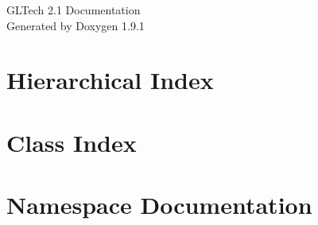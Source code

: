 \let\mypdfximage\pdfximage\def\pdfximage{\immediate\mypdfximage}\documentclass[twoside]{book}
\newcommand{\+}{\discretionary{\mbox{\scriptsize$\hookleftarrow$}}{}{}}
\newcommand{\clearemptydoublepage}{%
  \newpage{\pagestyle{empty}\cleardoublepage}%
}
\begin{document}
\raggedbottom

\hypersetup{pageanchor=false,
             bookmarksnumbered=true,
             pdfencoding=unicode
            }
\begin{titlepage}
\vspace*{7cm}
\begin{center}%
{\Large GLTech 2.1 Documentation }\\
\vspace*{1cm}
{\large Generated by Doxygen 1.9.1}\\
\end{center}
\end{titlepage}
\clearemptydoublepage
{}
\tableofcontents
\clearemptydoublepage
{}
\hypersetup{pageanchor=true}

\chapter{Hierarchical Index}

\chapter{Class Index}

\chapter{Namespace Documentation}





\end{document}
